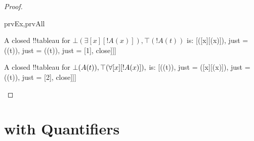 \documentclass[10pt,a4paper]{article}
\theoremstyle{plain}
\theoremstyle{definition}
\theoremstyle{remark}
\newcommand*{\olfileid}[3]{}
\newcommand*{\olsection}[1]{\section*{#1}}
\newenvironment{oltableau}{}{}
\providecommand{\lforall}{\mathord{\forall}}
\providecommand{\lexists}{\mathord{\exists}}
\providecommand{\sFmla}[2]{#1(#2)}
\providecommand{\formula}{\relax}
\providecommand{\True}{\top}
\providecommand{\False}{\bot}
\providecommand{\tagitem}[1]{\item[#1]}
\providecommand{\TAss}[1]{}
\providecommand{\TRule}[1]{}
\providecommand{\formula}[1]{#1}
\begin{document}
\begin{proof}
\begin{tagenumerate}{prvEx,prvAll}
\tagitem{prvEx}{A closed !!{tableau} for
  $\sFmla{\False}{\lexists[x][!A(x)]}, \sFmla{\True}{!A(t)}$ is:
  \begin{oltableau}
    [\sFmla{\False}{\lexists[x][\formula{A}(x)]}, just = \TAss
      [\sFmla{\True}{\formula{A}(t)}, just = \TAss
        [\sFmla{\False}{\formula{A}(t)}, just = {\TRule{\False}{\lexists}[1]}, close]]]
    \end{oltableau}}{}
\tagitem{prvAll}{A closed !!{tableau} for
  $\sFmla{\False}{\formula{A}(t)}, \sFmla{\True}{\lforall[x][!A(x)]}, $ is:
  \begin{oltableau}
    [\sFmla{\False}{\formula{A}(t)}, just = \TAss
      [\sFmla{\True}{\lforall[x][\formula{A}(x)]}, just = \TAss
        [\sFmla{\True}{\formula{A}(t)}, just = {\TRule{\True}{\lforall}[2]}, close]]]
    \end{oltableau}}{}
\end{tagenumerate}
\end{proof}





\olfileid{fol}{tab}{prq}

\olsection{ with Quantifiers}
\end{document}
